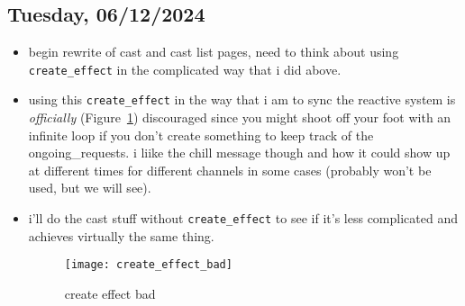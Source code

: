 \clearpage
\subsection*{Tuesday, 06/12/2024}
\begin{itemize}
    \item begin rewrite of cast and cast list pages, need to think about using 
        \texttt{create_effect} in the complicated way that i did above.
    \item using this \texttt{create_effect} in the way that i am to sync the
        reactive system is \textit{officially} 
        (Figure~\ref{fig:create_effect_bad}) discouraged since you might shoot
        off your foot with an infinite loop if you don't create something to
        keep track of the ongoing_requests. i liike the chill message though and
        how it could show up at different times for different channels in some
        cases (probably won't be used, but we will see).
    \item i'll do the cast stuff without \texttt{create_effect} to see
        if it's less complicated and achieves virtually the same thing. 

        \begin{figure}[ht]
            \centering
            \texttt{[image: create\_effect\_bad]}
            \captionsetup{labelfont=bf, textfont=it}
            \caption{create effect bad}
            \label{fig:create_effect_bad}
        \end{figure}
\end{itemize}
